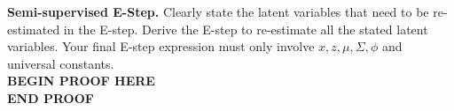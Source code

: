 \item{} \textbf{Semi-supervised E-Step.}
Clearly state the latent variables that need to be re-estimated in the E-step. Derive the E-step to re-estimate all the stated latent variables. Your final E-step expression must only involve $x, z, \mu, \Sigma, \phi$ and universal constants.\\

{\bf BEGIN PROOF HERE}\\[200pt]
{\bf END PROOF}\\